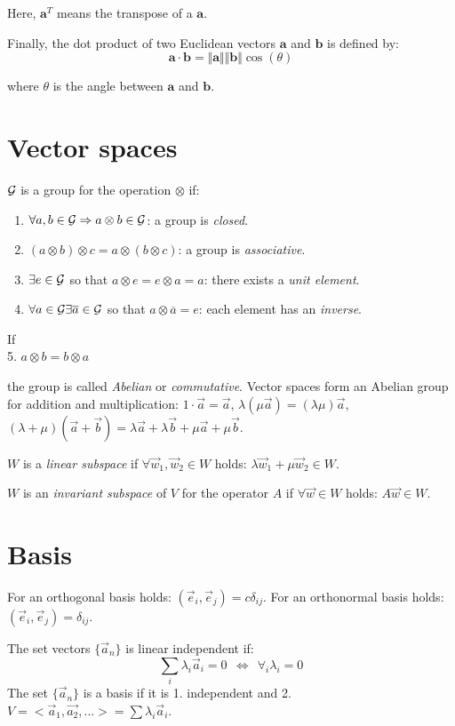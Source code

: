 Here, $\displaystyle \mathbf {a} ^{T}$ means the transpose of a $\displaystyle \mathbf {a} $.

Finally, the dot product of two Euclidean vectors  $\mathbf{a}$ and $\mathbf{b}$ is defined by:
\[ 
\mathbf{a} \cdot \mathbf{b} = \Vert \mathbf{a} \Vert  \Vert \mathbf{b} \Vert \cos(\theta)
\] 

where $\theta$ is the angle between $\mathbf{a}$ and $\mathbf{b}$.

\section{Vector spaces}
$\cal G$ is a group for the operation $\otimes$ if:
\begin{enumerate}
	\item $\forall a,b\in{\cal G}\Rightarrow a\otimes b\in\cal G$: a group is
	{\it closed}.
	\item $(a\otimes b)\otimes c = a\otimes (b\otimes c)$: a group is
	{\it associative}.
	\item $\exists e\in{\cal G}$ so that $a\otimes e=e\otimes a=a$: there exists a
	{\it unit element}.
	\item $\forall a\in{\cal G}\exists \overline{a}\in{\cal G}$ so that $a\otimes\overline{a}=e$:
	each element has an {\it inverse}.
\end{enumerate}
If\\
\hspace*{4.5mm}5. $a\otimes b=b\otimes a$

the group is called {\it Abelian} or {\it commutative}.
Vector spaces form an Abelian group for addition and multiplication:
$1\cdot\vec{a}=\vec{a}$, $\lambda(\mu\vec{a})=(\lambda\mu)\vec{a}$,
$(\lambda+\mu)(\vec{a}+\vec{b})=\lambda\vec{a}+\lambda\vec{b}+\mu\vec{a}+\mu\vec{b}$.

$W$ is a {\it linear subspace} if $\forall \vec{w}_1,\vec{w}_2\in W$
holds: $\lambda\vec{w}_1+\mu\vec{w}_2\in W$.

$W$ is an {\it invariant subspace} of $V$ for the operator $A$ if
$\forall\vec{w}\in W$ holds: $A\vec{w}\in W$.

\section{Basis}
For an orthogonal basis holds: $(\vec{e}_i,\vec{e}_j)=c\delta_{ij}$. For an
orthonormal basis holds:  $(\vec{e}_i,\vec{e}_j)=\delta_{ij}$.

The set vectors $\{\vec{a}_n\}$ is linear independent if:
\[
\sum\limits_i\lambda_i\vec{a}_i=0~~\Leftrightarrow~~\forall_i\lambda_i=0
\]
The set $\{\vec{a}_n\}$ is a basis if it is 1. independent and 2.
$V=<\vec{a}_1,\vec{a_2},...>=\sum\lambda_i\vec{a}_i$.

